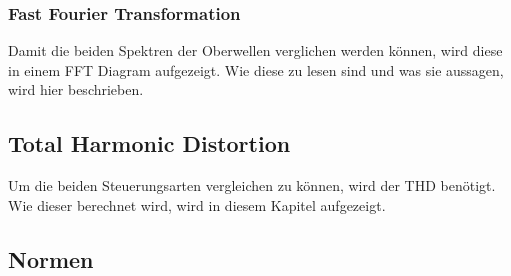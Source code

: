 \subsubsection{Fast Fourier Transformation}
Damit die beiden Spektren der Oberwellen verglichen werden können, wird diese in einem FFT Diagram aufgezeigt. Wie diese zu lesen sind und was sie aussagen, wird hier beschrieben. 

\subsection{Total Harmonic Distortion}
Um die beiden Steuerungsarten vergleichen zu können, wird der THD benötigt. Wie dieser berechnet wird, wird in diesem Kapitel aufgezeigt. 


\subsection{Normen}


